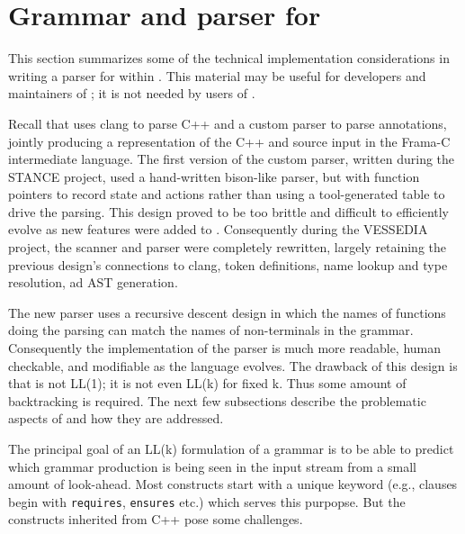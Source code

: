 \newcommand{\lang}{C++\xspace}
\chapter{Grammar and parser for \acslpp}
\label{sec:grammar}

This section summarizes some of the technical implementation considerations in writing a parser for \acslpp within \fclang. 
This material may be useful for developers and maintainers of \fclang; it is not needed by users of \fclang.

Recall that \fclang uses clang to parse \lang and a custom parser to parse \acslpp annotations, jointly producing a representation of the \lang and \acslpp source input in the Frama-C intermediate language. 
The first version of the \acslpp custom parser, written during the STANCE project, used a hand-written bison-like parser, but with function pointers to record state and actions rather than using a tool-generated table to drive the parsing. 
This design proved to be too brittle and difficult to efficiently evolve as new features were added to \acslpp. 
Consequently during the VESSEDIA project, the scanner and parser were completely rewritten, largely retaining the previous design's connections to clang, token definitions, name lookup and type resolution, ad AST generation.

The new parser uses a recursive descent design in which the names of functions doing the parsing can match the names of non-terminals in the grammar. 
Consequently the implementation of the parser is much more readable, human checkable, and modifiable as the \acslpp language evolves. 
The drawback of this design is that \acslpp is not LL(1); it is not even LL(k) for fixed k. 
Thus some amount of backtracking is required. 
The next few subsections describe the problematic aspects of \acslpp and how they are addressed.

The principal goal of an LL(k) formulation of a grammar is to be able to predict which grammar production is being seen in the input stream from a small amount of look-ahead.
Most \acslpp constructs start with a unique keyword (e.g., clauses begin with \lstinline|requires|, \lstinline|ensures| etc.) which serves this purpopse. 
But the constructs inherited from \lang pose some challenges.

